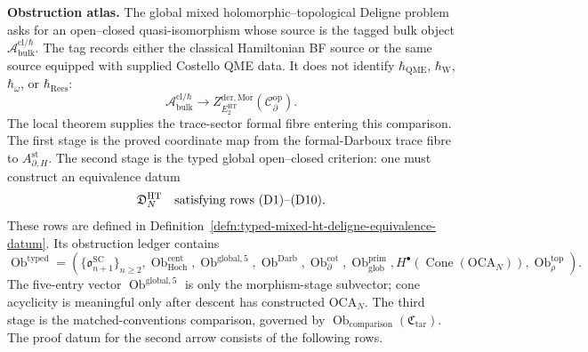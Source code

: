 \documentclass[11pt]{memoir}
\begin{document}
  \medskip\noindent
  \textbf{Obstruction atlas.}
  The global mixed holomorphic--topological Deligne problem asks for an
  open--closed quasi-isomorphism
  whose source is the tagged bulk object
  \(\mathcal A^{\mathrm{cl}/\hbar}_{\mathrm{bulk}}\).  The tag records
  either the classical Hamiltonian BF source or the same source equipped
  with supplied Costello QME data.  It does not identify
  \(\hbar_{\mathrm{QME}}\), \(\hbar_{\mathrm{W}}\), \(\hbar_\omega\), or
  \(\hbar_{\mathrm{Rees}}\):
  \[
    \mathcal A^{\mathrm{cl}/\hbar}_{\mathrm{bulk}}
    \longrightarrow
    Z^{\mathrm{der},\mathrm{Mor}}_{E_2^{\mathrm{HT}}}
      (\mathcal C^{\mathrm{op}}_\partial).
  \]
  The local theorem supplies the trace-sector formal fibre entering this
  comparison.  The first stage is the proved coordinate map from the
  formal-Darboux trace fibre to \(A^{\mathrm{st}}_{\partial,H}\).
  The second stage is the typed global open--closed criterion: one must
  construct an equivalence datum
  \[
    \mathfrak D^{\mathrm{HT}}_N
    \quad\text{satisfying rows \textup{(D1)}--\textup{(D10)}.}
  \]
  These rows are defined in
  Definition~\ref{defn:typed-mixed-ht-deligne-equivalence-datum}.
  Its obstruction ledger contains
  \[
    \operatorname{Ob}^{\mathrm{typed}}
    =
    \left(
      \{\mathfrak o^{\mathrm{SC}}_{n+1}\}_{n\ge2},
      \operatorname{Ob}^{\mathrm{cent}}_{\mathrm{Hoch}},
      \operatorname{Ob}^{\mathrm{global},5},
      \operatorname{Ob}^{\mathrm{Darb}},
      \operatorname{Ob}^{\mathrm{cot}}_\partial,
      \operatorname{Ob}^{\mathrm{prim}}_{\mathrm{glob}},
      H^\bullet(\operatorname{Cone}(\mathrm{OCA}_N)),
      \operatorname{Ob}^{\mathrm{top}}_\rho
    \right).
  \]
  The five-entry vector \(\operatorname{Ob}^{\mathrm{global},5}\) is only
  the morphism-stage subvector; cone acyclicity is meaningful only after
  descent has constructed \(\mathrm{OCA}_N\).
  The third stage is the matched-conventions comparison, governed by
  \(\operatorname{Ob}_{\mathrm{comparison}}(\mathfrak C_{\mathrm{tar}})\).
  The proof datum for the second arrow consists of the following rows.
\end{document}
